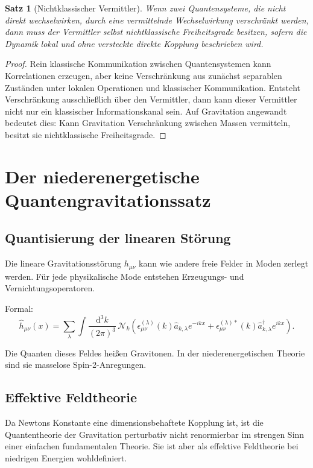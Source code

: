 \documentclass[11pt,a4paper,oneside]{book}
\theoremstyle{definition}
\theoremstyle{plain}
\newtheorem{satz}[definition]{Satz}
\theoremstyle{remark}
\newcommand{\dd}{\mathrm{d}}
\begin{document}
\begin{satz}[Nichtklassischer Vermittler]
Wenn zwei Quantensysteme, die nicht direkt wechselwirken, durch eine vermittelnde Wechselwirkung verschränkt werden, dann muss der Vermittler selbst nichtklassische Freiheitsgrade besitzen, sofern die Dynamik lokal und ohne versteckte direkte Kopplung beschrieben wird.
\end{satz}

\begin{proof}
Rein klassische Kommunikation zwischen Quantensystemen kann Korrelationen erzeugen, aber keine Verschränkung aus zunächst separablen Zuständen unter lokalen Operationen und klassischer Kommunikation. Entsteht Verschränkung ausschließlich über den Vermittler, dann kann dieser Vermittler nicht nur ein klassischer Informationskanal sein. Auf Gravitation angewandt bedeutet dies: Kann Gravitation Verschränkung zwischen Massen vermitteln, besitzt sie nichtklassische Freiheitsgrade.
\end{proof}

\chapter{Der niederenergetische Quantengravitationssatz}
\section{Quantisierung der linearen Störung}
Die lineare Gravitationsstörung $h_{\mu\nu}$ kann wie andere freie Felder in Moden zerlegt werden. Für jede physikalische Mode entstehen Erzeugungs- und Vernichtungsoperatoren.

Formal:
\[
\hat h_{\mu\nu}(x)=\sum_\lambda\int \frac{\dd^3k}{(2\pi)^3}\,\mathcal{N}_k
\left(\epsilon^{(\lambda)}_{\mu\nu}(k)\hat a_{k,\lambda}e^{-ikx}+\epsilon^{(\lambda)*}_{\mu\nu}(k)\hat a^\dagger_{k,\lambda}e^{ikx}\right).
\]

Die Quanten dieses Feldes heißen Gravitonen. In der niederenergetischen Theorie sind sie masselose Spin-2-Anregungen.

\section{Effektive Feldtheorie}
Da Newtons Konstante eine dimensionsbehaftete Kopplung ist, ist die Quantentheorie der Gravitation perturbativ nicht renormierbar im strengen Sinn einer einfachen fundamentalen Theorie. Sie ist aber als effektive Feldtheorie bei niedrigen Energien wohldefiniert.
\end{document}
